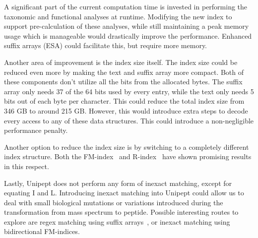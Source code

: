 \documentclass[11pt]{article}
\begin{document}
\begin{multicols}{2}
        A significant part of the current computation time is invested in performing the taxonomic and functional analyses at runtime.
        Modifying the new index to support pre-calculation of these analyses, while still maintaining a peak memory usage which is manageable would drastically improve the performance.
        Enhanced suffix arrays (ESA) could facilitate this, but require more memory.

        Another area of improvement is the index size itself.
        The index size could be reduced even more by making the text and suffix array more compact.
        Both of these components don't utilize all the bits from the allocated bytes.
        The suffix array only needs 37 of the 64 bits used by every entry, while the text only needs 5 bits out of each byte per character.
        This could reduce the total index size from 346 GB to around 215 GB\@.
        However, this would introduce extra steps to decode every access to any of these data structures.
        This could introduce a non-negligible performance penalty.

        Another option to reduce the index size is by switching to a completely different index structure.
        Both the FM-index~\cite{fm_index} and R-index~\cite{r_index} have shown promising results in this respect.

        Lastly, Unipept does not perform any form of inexact matching, except for equating I and L\@.
        Introducing inexact matching into Unipept could allow us to deal with small biological mutations or variations introduced during the transformation from mass spectrum to peptide.
        Possible interesting routes to explore are regex matching using suffix arrays~\cite{regex_sa}, or inexact matching using bidirectional FM-indices.
        \printbibliography
    \end{multicols}
\end{document}
